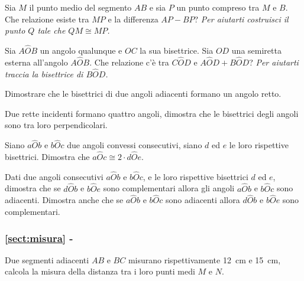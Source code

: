 \begin{multicols}{2}
\begin{esercizio}
\label{ese:1.98}
Sia $M$ il punto medio del segmento $AB$ e sia $P$ un punto compreso tra $M$ e $B$. Che relazione esiste tra $MP$ e la differenza $AP-BP$? \emph{Per aiutarti costruisci il punto $Q$ tale che $QM\cong MP$.}
\end{esercizio}

\begin{esercizio}
\label{ese:1.99}
Sia $A\widehat{O}B$ un angolo qualunque e $OC$ la sua bisettrice. Sia $OD$ una semiretta esterna all'angolo $A\widehat{O}B$. Che relazione c'è tra $C\widehat{O}D$ e $A\widehat{O}D+B\widehat{O}D$? \emph{Per aiutarti traccia la bisettrice di $B\widehat{O}D$.}
\end{esercizio}

\begin{esercizio}
\label{ese:1.100}
Dimostrare che le bisettrici di due angoli adiacenti formano un angolo retto.
\end{esercizio}

\begin{esercizio}
\label{ese:1.101}
Due rette incidenti formano quattro angoli, dimostra che le bisettrici degli angoli sono tra loro perpendicolari.
\end{esercizio}

\begin{esercizio}
\label{ese:1.102}
Siano $a\widehat{O}b$ e $b\widehat{O}c$ due angoli convessi consecutivi, siano $d$ ed $e$ le loro rispettive bisettrici. Dimostra che $a\widehat{O}c\cong 2\cdot d\widehat{O}e$.
\end{esercizio}

\begin{esercizio}
\label{ese:1.103}
Dati due angoli consecutivi $a\widehat{O}b$ e $b\widehat{O}c$, e le loro rispettive bisettrici $d$ ed $e$, dimostra che se $d\widehat{O}b$ e $b\widehat{O}e$ sono complementari allora gli angoli $a\widehat{O}b$ e $b\widehat{O}c$ sono adiacenti. Dimostra anche che se $a\widehat{O}b$ e $b\widehat{O}c$ sono adiacenti allora  $d\widehat{O}b$ e $b\widehat{O}e$ sono complementari.
\end{esercizio}

\begingroup
\hypersetup{linkcolor=black}
\subsubsection*{\ref{sect:misura} - }
\endgroup

\begin{esercizio}
\label{ese:1.104}
Due segmenti adiacenti $AB$ e $BC$ misurano rispettivamente 12~cm e 15~cm, calcola la misura della distanza tra i loro punti medi $M$ e $N$.
\end{esercizio}


\end{multicols}
